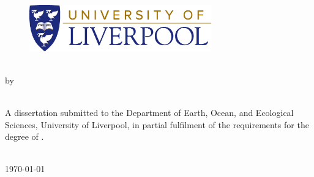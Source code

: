 

\thispagestyle{empty}

\begin{figure}[t!]
  \begin{center}
    \includegraphics[width=0.7\textwidth]{figures/university-of-liverpool-logo.eps}
  \end{center}
\end{figure}

\vspace*{3cm}

\begin{center}
  \textbf{\LARGE \Title{}}
  \\[10mm]
  {\Large by}
  \\[10mm]
  {\Large \Name}
  \\
  \vfill
  \begin{minipage}[t]{0.7\textwidth}
    A dissertation submitted to the
    Department of Earth, Ocean, and
    Ecological Sciences,
    University of Liverpool, in partial fulfilment of
    the requirements for the degree of
    \Degree{}.
  \end{minipage}
  \\[3cm]
  \monthyear\today
\end{center}
